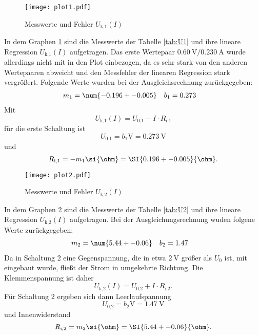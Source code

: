  \begin{figure}[h]
    \texttt{[image: plot1.pdf]}
    \label{fig:U1}
    \caption{Messwerte und Fehler $U_\text{k,1}(I)$}
  \end{figure}

  In dem Graphen \ref{fig:U1} sind die Messwerte der Tabelle
  \ref{tab:U1} und ihre lineare Regression
  $U_\text{k,1}(I)$ aufgetragen.
  Das erste Wertepaar $\SI{0.60}{\V}/ \SI{0.230}{\A}$
  wurde allerdings nicht mit in den Plot einbezogen,
  da es sehr stark von den anderen Wertepaaren abweicht und
  den Messfehler der linearen Regression stark vergrößert.
  Folgende Werte wurden bei der Ausgleichsrechnung zurückgegeben:
  \begin{align}
    m_1 & = \num{-0.196 +- 0.005} & b_1 & = 0.273
  \end{align}
  Mit
  \begin{equation}
    U_\text{k,1}(I) = U_\text{0,1} - I \cdot R_\text{i,1}
  \end{equation}
  für die erste Schaltung ist
  \begin{equation}
    U_\text{0,1} = b_1 \si{\V} = \SI{0.273}{\V}
  \end{equation}
  und
  \begin{equation}
    R_\text{i,1} = -m_1 \si{\ohm} = \SI{0.196 +- 0.005}{\ohm}.
  \end{equation}

  \newpage

  \begin{figure}[h]
    \texttt{[image: plot2.pdf]}
    \label{fig:U2}
    \caption{Messwerte und Fehler $U_\text{k,2}(I)$}
  \end{figure}

  In dem Graphen \ref{fig:U2} sind die Messwerte der Tabelle
  \ref{tab:U2} und ihre lineare Regression
  $U_\text{k,2}(I)$ aufgetragen.
  Bei der Ausgleichungsrechnung wuden folgene Werte zurückgegeben:
  \begin{align}
    m_2 & = \num{5.44 +- 0.06} & b_2 & = 1.47
  \end{align}
  Da in Schaltung 2 eine Gegenspannung, die in etwa $\SI{2}{\V}$ größer als
  $U_0$ ist, mit eingebaut wurde, fließt der Strom in umgekehrte Richtung.
  Die Klemmenspannung ist daher
  \begin{equation}
    U_\text{k,2}(I) = U_\text{0,2} + I \cdot R_\text{i,2}.
  \end{equation}
  Für Schaltung 2 ergeben sich dann Leerlaufspannung
  \begin{equation}
    U_\text{0,2} = b_2 \si{\V} = \SI{1.47}{\V}
  \end{equation}
  und Innenwiderstand
  \begin{equation}
    R_\text{i,2} = m_2 \si{\ohm} = \SI{5.44 +- 0.06}{\ohm}.
  \end{equation}

